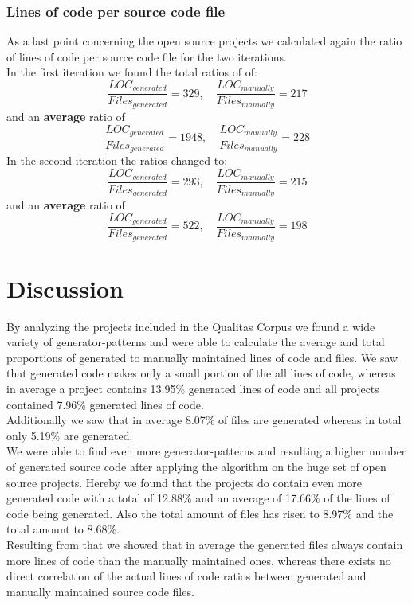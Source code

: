 \subsubsection{Lines of code per source code file}
As a last point concerning the open source projects we calculated again the ratio of lines of code per source code file for the two iterations.\\
In the first iteration we found the total ratios of of:
\begin{equation}
	\frac{LOC_{generated}}{Files_{generated}} = 329 , \quad \frac{LOC_{manually}}{Files_{manually}} = 217
\end{equation}
and an \textbf{average} ratio of
\begin{equation}
	\frac{LOC_{generated}}{Files_{generated}} = 1948 , \quad \frac{LOC_{manually}}{Files_{manually}} = 228
\end{equation}
In the second iteration the ratios changed to:
\begin{equation}
\frac{LOC_{generated}}{Files_{generated}} = 293 , \quad \frac{LOC_{manually}}{Files_{manually}} = 215
\end{equation}
and an \textbf{average} ratio of
\begin{equation}
\frac{LOC_{generated}}{Files_{generated}} = 522 , \quad \frac{LOC_{manually}}{Files_{manually}} = 198
\end{equation}



\cleardoublepage{}
\section{Discussion}
By analyzing the projects included in the Qualitas Corpus we found a wide variety of generator-patterns and were able to calculate the average and total proportions of generated to manually maintained lines of code and files. We saw that generated code makes only a small portion of the all lines of code, whereas in average a project contains 13.95\% generated lines of code and all projects contained 7.96\% generated lines of code.\\
Additionally we saw that in average 8.07\% of files are generated whereas in total only 5.19\% are generated.\\
We were able to find even more generator-patterns and resulting a higher number of generated source code after applying the algorithm on the huge set of open source projects. Hereby we found that the projects do contain even more generated code with a total of 12.88\% and an average of 17.66\% of the lines of code being generated. Also the total amount of files has risen to 8.97\% and the total amount to 8.68\%.\\
Resulting from that we showed that in average the generated files always contain more lines of code than the manually maintained ones, whereas there exists no direct correlation of the actual lines of code ratios between generated and manually maintained source code files.

